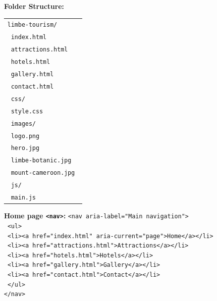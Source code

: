 \documentclass[11pt]{article}
\begin{document}
\begin{corrige}[Exercise 6]
\textbf{Folder Structure:}
\begin{center}
\begin{tabular}{|p{0.95\linewidth}|}\hline
\texttt{limbe-tourism/}\\
\texttt{\textbar{}\textbar{} index.html}\\
\texttt{\textbar{}\textbar{} attractions.html}\\
\texttt{\textbar{}\textbar{} hotels.html}\\
\texttt{\textbar{}\textbar{} gallery.html}\\
\texttt{\textbar{}\textbar{} contact.html}\\
\texttt{\textbar{}\textbar{} css/}\\
\texttt{\textbar{}\textbar{} \textbar{}\textbar{} style.css}\\
\texttt{\textbar{}\textbar{} images/}\\
\texttt{\textbar{}\textbar{} \textbar{}\textbar{} logo.png}\\
\texttt{\textbar{}\textbar{} \textbar{}\textbar{} hero.jpg}\\
\texttt{\textbar{}\textbar{} \textbar{}\textbar{} limbe-botanic.jpg}\\
\texttt{\textbar{}\textbar{} \textbar{}\textbar{} mount-cameroon.jpg}\\
\texttt{\textbar{}\textbar{} js/}\\
\texttt{\textbar{}\textbar{} \textbar{}\textbar{} main.js}\\\hline
\end{tabular}
\end{center}

\textbf{Home page \texttt{<nav>}:}
\texttt{<nav aria-label="Main navigation">}\\
\texttt{  <ul>}\\
\texttt{    <li><a href="index.html" aria-current="page">Home</a></li>}\\
\texttt{    <li><a href="attractions.html">Attractions</a></li>}\\
\texttt{    <li><a href="hotels.html">Hotels</a></li>}\\
\texttt{    <li><a href="gallery.html">Gallery</a></li>}\\
\texttt{    <li><a href="contact.html">Contact</a></li>}\\
\texttt{  </ul>}\\
\texttt{</nav>}


\end{corrige}
\end{document}
